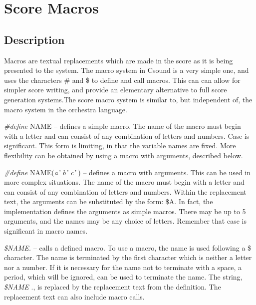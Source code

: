 \begin{comment}
\documentclass[10pt]{article}
\usepackage{fullpage, graphicx, url}
\setlength{\parskip}{1ex}
\setlength{\parindent}{0ex}
\title{Score Macros}



\begin{tabular}{ccc}
The Alternative Csound Reference Manual & & \\
Previous &The Standard Numeric Score &Next

\end{tabular}

\end{comment}
\section{Score Macros}
\subsection*{Description}


  Macros are textual replacements which are made in the score as it is being presented to the system. The macro system in Csound is a very simple one, and uses the characters \# and \$ to define and call macros. This can can allow for simpler score writing, and provide an elementary alternative to full score generation systems.The score macro system is similar to, but independent of, the macro system in the orchestra language. 


 \emph{\#define}
 NAME -- defines a simple macro. The name of the macro must begin with a letter and can consist of any combination of letters and numbers. Case is significant. This form is limiting, in that the variable names are fixed. More flexibility can be obtained by using a macro with arguments, described below. 


 \emph{\#define}
 NAME(\emph{a' b' c'}
) -- defines a macro with arguments. This can be used in more complex situations. The name of the macro must begin with a letter and can consist of any combination of letters and numbers. Within the replacement text, the arguments can be substituted by the form: \$A. In fact, the implementation defines the arguments as simple macros. There may be up to 5 arguments, and the names may be any choice of letters. Remember that case is significant in macro names. 


 \emph{\$NAME.}
 -- calls a defined macro. To use a macro, the name is used following a \$ character. The name is terminated by the first character which is neither a letter nor a number. If it is necessary for the name not to terminate with a space, a period, which will be ignored, can be used to terminate the name. The string, \emph{\$NAME}
., is replaced by the replacement text from the definition. The replacement text can also include macro calls. 


